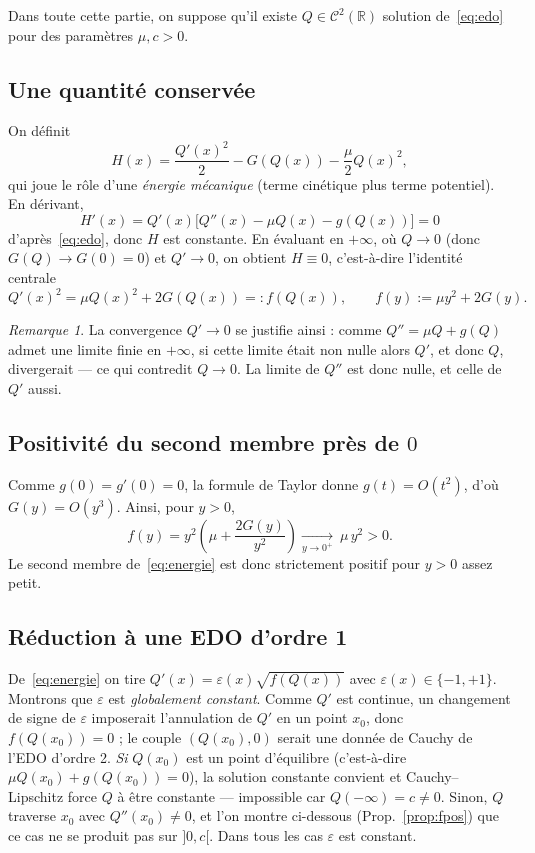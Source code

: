 \documentclass[11pt,a4paper]{article}
\theoremstyle{plain}
\theoremstyle{remark}
\newtheorem*{remarque}{Remarque}
\newcommand{\R}{\mathbb{R}}
\newcommand{\eps}{\varepsilon}
\begin{document}
Dans toute cette partie, on suppose qu'il existe $Q\in\mathcal{C}^2(\R)$ solution
de~\eqref{eq:edo} pour des paramètres $\mu,c>0$.

\subsection{Une quantité conservée}
On définit
\[
  H(x)=\frac{Q'(x)^2}{2}-G(Q(x))-\frac{\mu}{2}Q(x)^2,
\]
qui joue le rôle d'une \emph{énergie mécanique} (terme cinétique plus terme
potentiel). En dérivant,
\[
  H'(x)=Q'(x)\big[Q''(x)-\mu Q(x)-g(Q(x))\big]=0
\]
d'après~\eqref{eq:edo}, donc $H$ est constante. En évaluant en $+\infty$, où
$Q\to0$ (donc $G(Q)\to G(0)=0$) et $Q'\to0$, on obtient $H\equiv0$, c'est-à-dire
l'identité centrale
\begin{equation}\label{eq:energie}
  Q'(x)^2 = \mu Q(x)^2 + 2G(Q(x)) =: f(Q(x)),
  \qquad f(y):=\mu y^2+2G(y).
\end{equation}

\begin{remarque}
La convergence $Q'\to0$ se justifie ainsi : comme $Q''=\mu Q+g(Q)$ admet une
limite finie en $+\infty$, si cette limite était non nulle alors $Q'$, et donc
$Q$, divergerait — ce qui contredit $Q\to0$. La limite de $Q''$ est donc nulle,
et celle de $Q'$ aussi.
\end{remarque}

\subsection{Positivité du second membre près de $0$}
Comme $g(0)=g'(0)=0$, la formule de Taylor donne $g(t)=O(t^2)$, d'où
$G(y)=O(y^3)$. Ainsi, pour $y>0$,
\[
  f(y)=y^2\!\left(\mu+\frac{2G(y)}{y^2}\right)\xrightarrow[y\to0^+]{}\ \mu\,y^2>0.
\]
Le second membre de~\eqref{eq:energie} est donc strictement positif pour $y>0$
assez petit.

\subsection{Réduction à une EDO d'ordre 1}
De~\eqref{eq:energie} on tire $Q'(x)=\eps(x)\sqrt{f(Q(x))}$ avec
$\eps(x)\in\{-1,+1\}$. Montrons que $\eps$ est \emph{globalement constant}.
Comme $Q'$ est continue, un changement de signe de $\eps$ imposerait l'annulation
de $Q'$ en un point $x_0$, donc $f(Q(x_0))=0$ ; le couple $(Q(x_0),0)$ serait une
donnée de Cauchy de l'EDO d'ordre 2. \emph{Si} $Q(x_0)$ est un point d'équilibre
(c'est-à-dire $\mu Q(x_0)+g(Q(x_0))=0$), la solution constante convient et
Cauchy–Lipschitz force $Q$ à être constante — impossible car $Q(-\infty)=c\neq0$.
Sinon, $Q$ traverse $x_0$ avec $Q''(x_0)\neq0$, et l'on montre ci-dessous
(Prop.~\ref{prop:fpos}) que ce cas ne se produit pas sur $]0,c[$. Dans tous les
cas $\eps$ est constant.
\end{document}
